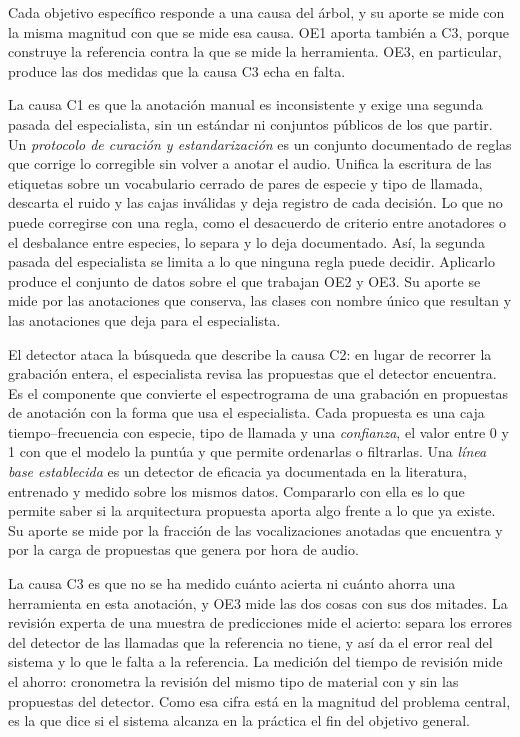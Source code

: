 Cada objetivo específico responde a una causa del árbol, y su aporte se mide con
la misma magnitud con que se mide esa causa. OE1 aporta también a C3, porque
construye la referencia contra la que se mide la herramienta. OE3, en particular, produce
las dos medidas que la causa C3 echa en falta.

 La causa C1 es que la anotación manual es
inconsistente y exige una segunda pasada del especialista, sin un estándar ni
conjuntos públicos de los que partir. Un \emph{protocolo de curación y estandarización} es un conjunto
documentado de reglas que corrige lo corregible sin volver a anotar el audio.
Unifica la escritura de las etiquetas sobre un vocabulario cerrado de pares de
especie y tipo de llamada, descarta el ruido y las cajas inválidas y deja registro
de cada decisión. Lo que no puede corregirse con una regla, como el desacuerdo de
criterio entre anotadores o el desbalance entre especies, lo separa y lo deja
documentado. Así, la segunda pasada del especialista se limita a lo que
ninguna regla puede decidir. Aplicarlo produce el conjunto de datos sobre el que
trabajan OE2 y OE3. Su aporte se mide por las anotaciones que conserva, las clases
con nombre único que resultan y las anotaciones que deja para el especialista.

 El detector ataca la búsqueda que describe la causa C2:
en lugar de recorrer la grabación entera, el especialista revisa las propuestas
que el detector encuentra. Es el componente que convierte el espectrograma de una
grabación en propuestas de anotación con la forma que usa el especialista. Cada
propuesta es una caja tiempo--frecuencia con especie, tipo de llamada y una
\emph{confianza}, el valor entre 0 y 1 con que el modelo la puntúa y que permite
ordenarlas o filtrarlas. Una \emph{línea base establecida} es un detector de
eficacia ya documentada en la literatura, entrenado y medido sobre los mismos
datos. Compararlo con ella es lo que permite saber si la arquitectura propuesta
aporta algo frente a lo que ya existe. Su aporte se mide por la fracción de las
vocalizaciones anotadas que encuentra y por la carga de propuestas que genera por
hora de audio.

 La causa C3 es que no se ha medido cuánto acierta ni
cuánto ahorra una herramienta en esta anotación, y OE3 mide las dos cosas con sus
dos mitades. La revisión experta de una muestra de predicciones mide el acierto:
separa los errores del detector de las llamadas que la referencia no tiene, y así
da el error real del sistema y lo que le falta a la referencia. La medición del
tiempo de revisión mide el ahorro: cronometra la revisión del mismo tipo de
material con y sin las propuestas del detector. Como esa cifra está en la
magnitud del problema central, es la que dice si el sistema alcanza en la
práctica el fin del objetivo general.


